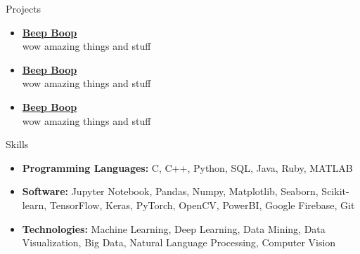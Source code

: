 \documentclass[]{../mcdowellcv}
\begin{document}
\begin{cvsection}{Projects}

    \begin{cvsubsection}{}{}{}
        \begin{itemize}
            \setlength\itemsep{3pt}
            \item\textbf{\href{https://github.com/johndoe/beepboop}{Beep Boop}} \\
            wow amazing things and stuff
        \end{itemize}
    \end{cvsubsection}
    
    \begin{cvsubsection}{}{}{}
        \begin{itemize}
            \setlength\itemsep{3pt}
            \item\textbf{\href{https://github.com/johndoe/beepboop}{Beep Boop}} \\
            wow amazing things and stuff
        \end{itemize}
    \end{cvsubsection}
    
    \begin{cvsubsection}{}{}{}
        \begin{itemize}
            \setlength\itemsep{3pt}
            \item\textbf{\href{https://github.com/johndoe/beepboop}{Beep Boop}} \\
            wow amazing things and stuff
        \end{itemize}
    \end{cvsubsection}
    
\end{cvsection}

\begin{cvsection}{Skills}
    \begin{cvsubsection}{}{}{}
        \begin{itemize}
            \item \textbf{Programming Languages:} C, C++, Python, SQL, Java, Ruby, MATLAB
            \item \textbf{Software:} Jupyter Notebook, Pandas, Numpy, Matplotlib, Seaborn, Scikit-learn, TensorFlow, Keras, PyTorch, OpenCV, PowerBI, Google Firebase, Git
            \item \textbf{Technologies:} Machine Learning, Deep Learning, Data Mining, Data Visualization, Big Data, Natural Language Processing, Computer Vision
        \end{itemize}
    \end{cvsubsection}
\end{cvsection}
\end{document}
